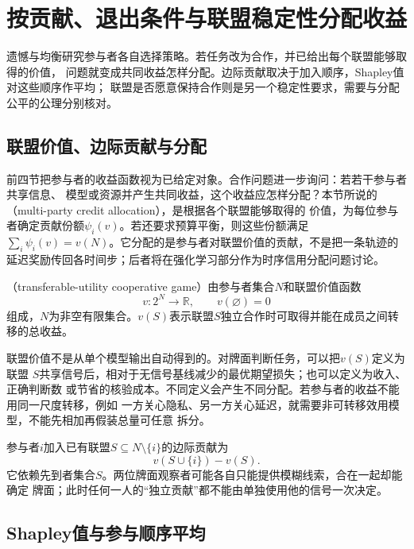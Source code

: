 \section{按贡献、退出条件与联盟稳定性分配收益}
\label{sec:game-credit-allocation-multiparty-payoffs}

遗憾与均衡研究参与者各自选择策略。若任务改为合作，并已给出每个联盟能够取得的价值，
问题就变成共同收益怎样分配。边际贡献取决于加入顺序，Shapley值对这些顺序作平均；
联盟是否愿意保持合作则是另一个稳定性要求，需要与分配公平的公理分别核对。

\subsection{联盟价值、边际贡献与分配}

前四节把参与者的收益函数视为已给定对象。合作问题进一步询问：若若干参与者共享信息、
模型或资源并产生共同收益，这个收益应怎样分配？本节所说的
（multi-party credit allocation），是根据各个联盟能够取得的
价值，为每位参与者确定贡献份额\(\psi_i(v)\)。若还要求预算平衡，则这些份额满足
\(\sum_i\psi_i(v)=v(N)\)。它分配的是参与者对联盟价值的贡献，不是把一条轨迹的
延迟奖励传回各时间步；后者将在强化学习部分作为时序信用分配问题讨论。

\begin{definition}[可转移效用博弈]
\label{def:game-transferable-utility-cooperation}
（transferable-utility cooperative game）由参与者集合\(N\)和联盟价值函数
\[
  v:2^N\to\mathbb{R},\qquad v(\varnothing)=0
\]
组成，$N$为非空有限集合。\(v(S)\)表示联盟\(S\)独立合作时可取得并能在成员之间转移的总收益。
\end{definition}

联盟价值不是从单个模型输出自动得到的。对牌面判断任务，可以把\(v(S)\)定义为联盟
\(S\)共享信号后，相对于无信号基线减少的最优期望损失；也可以定义为收入、正确判断数
或节省的核验成本。不同定义会产生不同分配。若参与者的收益不能用同一尺度转移，例如
一方关心隐私、另一方关心延迟，就需要非可转移效用模型，不能先相加再假装总量可任意
拆分。

参与者\(i\)加入已有联盟\(S\subseteq N\setminus\{i\}\)的边际贡献为
\[
  v(S\cup\{i\})-v(S).
\]
它依赖先到者集合\(S\)。两位牌面观察者可能各自只能提供模糊线索，合在一起却能确定
牌面；此时任何一人的“独立贡献”都不能由单独使用他的信号一次决定。

\subsection{Shapley值与参与顺序平均}


